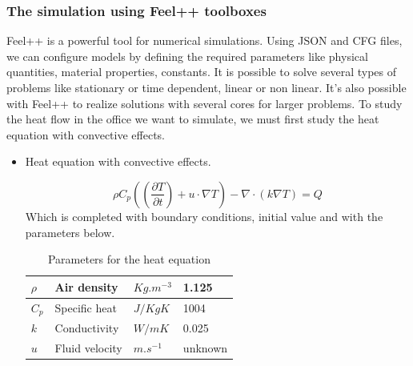 \subsubsection{The simulation using Feel++ toolboxes}
\noindent Feel++ is a powerful tool for numerical simulations. 
Using JSON and CFG files, we can configure models by defining the required parameters like physical quantities, material properties, constants. It is possible to solve several types of problems like stationary or time dependent, linear or non linear. It's also possible with Feel++ to realize solutions with several cores for larger problems.
\newline
\newline
\newline\noindent To study the heat flow in the office we want to simulate, we must first study the heat equation with convective effects.  
\begin{itemize}
    \item Heat equation with convective effects.

 $$\rho C_p((\frac{\partial T}{\partial t})+u \cdot \nabla T)-\nabla \cdot (k \nabla T)=Q$$
\noindent Which is completed with boundary conditions, initial value and with the parameters below.
\newline
\newline
\newline
\begin{table}[H]
\renewcommand{\arraystretch}{2}
\begin{tabular}{|R{3cm}|C{5cm}|L{3cm}|L{3cm}|}
\hline
$\rho$ & Air density & $Kg.m^
{-3}$ & 1.125  \\[0.5cm]
\hline
$C_p$ & Specific heat & $J/KgK$ & 1004 \\[0.5cm]
\hline
$k$ & Conductivity & $W/mK$ & 0.025  \\[0.5cm]
\hline
$u$ & Fluid velocity & $m.s^{-1}$ & unknown \\[0.5cm]
\hline
\end{tabular}
\\[10pt]
\caption*{Parameters for the heat equation}
\end{table}
\end{itemize}

